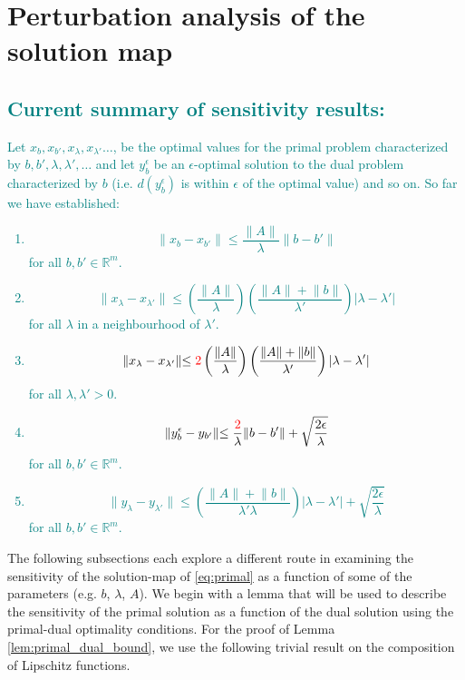 \documentclass[10pt,a4paper]{article}
\numberwithin{equation}{section}
\theoremstyle{definition}
\def\rr{{\mathbb R}}
\begin{document}
\section{Perturbation analysis of the solution map}

\textcolor{teal}{\subsection*{Current summary of sensitivity results:}
Let $x_b, x_{b'}, x_\lambda, x_{\lambda'} \dots$, be the optimal values for the primal problem characterized by $b, b', \lambda, \lambda', \dots$ and let $y_b^\epsilon$ be an $\epsilon$-optimal solution to the dual problem characterized by $b$  (i.e. $d(y_b^\epsilon)$ is within $\epsilon$ of the optimal value) and so on. So far we have established:
\begin{enumerate}
    \item \[
\lVert x_b - x_{b'} \rVert  \leq \frac{\lVert A \rVert}{\lambda} \rVert b - b' \rVert
\]
for all $b, b' \in \rr^m$.
    \item \[
\lVert x_\lambda - x_{\lambda'}\lVert \leq \left(\frac{\lVert A \rVert}{\lambda}\right) \left(\frac{\lVert A \rVert + \lVert b \rVert}{\lambda'}\right) | \lambda - \lambda' |
\] for all $\lambda$ in a neighbourhood of $\lambda'$.
 \item \[
\lVert x_\lambda - x_{\lambda'}\lVert \leq \textcolor{red}{2} \left(\frac{\lVert A \rVert}{\lambda}\right) \left(\frac{\lVert A \rVert + \lVert b \rVert}{\lambda'}\right) | \lambda - \lambda' |
\] for all $\lambda, \lambda' > 0$.
\item \[
\lVert y_b^\epsilon - y_{b'}\lVert \leq \frac{\textcolor{red}{2}}{\lambda} \lVert b - b'\rVert + \sqrt{\frac{2 \epsilon}{\lambda}}
\]
for all $b, b' \in \rr^m$.
\item \[
\lVert y_\lambda - y_{\lambda'}\lVert \leq \left(\frac{\lVert A \rVert + \lVert b \rVert}{\lambda'\lambda}\right) | \lambda - \lambda' | + \sqrt{\frac{2 \epsilon}{\lambda}}
\]
for all $b, b' \in \rr^m$.
\end{enumerate}
}

The following subsections each explore a different route in examining the sensitivity of the solution-map of \eqref{eq:primal} as a function of some of the parameters (e.g. $b$, $\lambda$, $A$). We begin with a lemma that will be used to describe the sensitivity of the primal solution as a function of the dual solution using the primal-dual optimality conditions. For the proof of Lemma \ref{lem:primal_dual_bound}, we use the following trivial result on the composition of Lipschitz functions.
\end{document}
